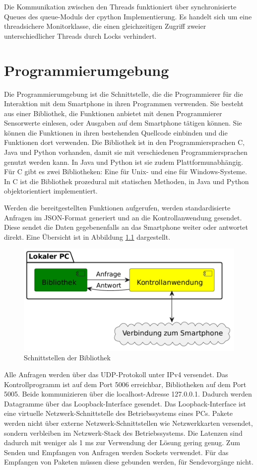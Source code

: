 \documentclass[11pt,a4paper]{report}
\begin{document}
Die Kommunikation zwischen den Threads funktioniert über synchronisierte Queues des queue-Moduls\cite{python_queue} der cpython Implementierung.
Es handelt sich um eine threadsichere Monitorklasse, die einen gleichzeitigen Zugriff zweier unterschiedlicher Threads durch Locks verhindert.

\chapter{Programmierumgebung}\label{chap:libs}
Die Programmierumgebung ist die Schnittstelle, die die Programmierer für die Interaktion mit dem Smartphone in ihren Programmen verwenden.
Sie besteht aus einer Bibliothek, die Funktionen anbietet mit denen Programmierer Sensorwerte einlesen, oder Ausgaben auf dem Smartphone tätigen können.
Sie können die Funktionen in ihren bestehenden Quellcode einbinden und die Funktionen dort verwenden.
Die Bibliothek ist in den Programmiersprachen C, Java und Python vorhanden, damit sie mit verschiedenen Programmiersprachen genutzt werden kann.
In Java und Python ist sie zudem Plattformunabhängig.
Für C gibt es zwei Bibliotheken: Eine für Unix- und eine für Windows-Systeme.
In C ist die Bibliothek prozedural mit statischen Methoden, in Java und Python objektorientiert implementiert.

Werden die bereitgestellten Funktionen aufgerufen, werden standardisierte Anfragen im JSON-Format generiert und an die Kontrollanwendung gesendet.
Diese sendet die Daten gegebenenfalls an das Smartphone weiter oder antwortet direkt.
Eine Übersicht ist in Abbildung \ref{fig:Schnittstelle Bibliothek} dargestellt.
\begin{figure}[htbp]
  \centering
  \includegraphics[width=.8\textwidth]{images/lib_server_connection}
  \caption{Schnittstellen der Bibliothek}
  \label{fig:Schnittstelle Bibliothek}
\end{figure}

Alle Anfragen werden über das UDP-Protokoll unter IPv4 versendet.
Das Kontrollprogramm ist auf dem Port 5006 erreichbar, Bibliotheken auf dem Port 5005.
Beide kommunizieren über die localhost-Adresse 127.0.0.1.
Dadurch werden Datagramme über das Loopback-Interface gesendet.
Das Loopback-Interface ist eine virtuelle Netzwerk-Schnittstelle des Betriebssystems eines PCs.
Pakete werden nicht über externe Netzwerk-Schnittstellen wie Netzwerkkarten versendet, sondern verbleiben im Netzwerk-Stack des Betriebssystems.
Die Latenzen sind dadurch mit weniger als 1 ms zur Verwendung der Lösung gering genug.
Zum Senden und Empfangen von Anfragen werden Sockets verwendet.
Für das Empfangen von Paketen müssen diese gebunden werden, für Sendevorgänge nicht.
\end{document}
